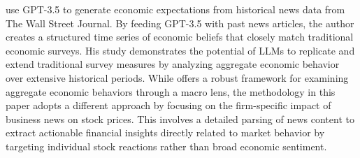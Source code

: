 \cite{bybee2023ghost} use GPT-3.5 to generate economic expectations from historical news data from The Wall Street Journal. By feeding GPT-3.5 with past news articles, the author creates a structured time series of economic beliefs that closely match traditional economic surveys. His study demonstrates the potential of LLMs to replicate and extend traditional survey measures by analyzing aggregate economic behavior over extensive historical periods. 
While \cite{bybee2023ghost} offers a robust framework for examining aggregate economic behaviors through a macro lens, the methodology in this paper adopts a different approach by focusing on the firm-specific impact of business news on stock prices. This involves a detailed parsing of news content to extract actionable financial insights directly related to market behavior by targeting individual stock reactions rather than broad economic sentiment.


\mx 



